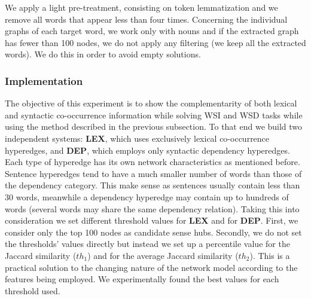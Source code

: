 We apply a light pre-treatment, consisting on token lemmatization and we remove all words that appear less than four times. Concerning the individual graphs of each target word, we work only with nouns and if the extracted graph has fewer than 100 nodes, we do not apply any filtering (we keep all the extracted words). We do this in order to avoid empty solutions.



\subsubsection{Implementation}
The objective of this experiment is to show the complementarity of both lexical and syntactic co-occurrence information while solving WSI and WSD tasks while using the method described in the previous subsection. To that end we build two independent systems: \textbf{LEX}, which uses exclusively lexical co-occurrence hyperedges, and \textbf{DEP}, which employs only syntactic dependency hyperedges. 
Each type of hyperedge has its own network characteristics as mentioned before. Sentence hyperedges tend to have a much smaller number of words than those of the dependency category. This make sense as sentences usually contain less than 30 words, meanwhile a dependency hyperedge may contain up to hundreds of words (several words may share the same dependency relation). Taking this into consideration we set different threshold values for \textbf{LEX} and for \textbf{DEP}. First, we  consider only the top 100 nodes as candidate sense hubs. Secondly, we do not set the thresholds' values directly but instead we set up a percentile value for the Jaccard similarity ($th_1$) and for the average Jaccard similarity ($th_2$). This is a practical solution to the changing nature of the network model according to the features being employed. We experimentally found the best values for  each threshold used.



%



